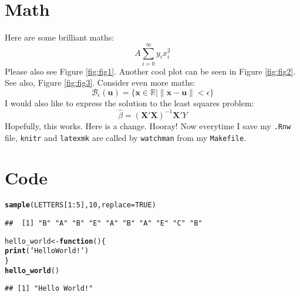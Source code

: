 \documentclass{article}\usepackage[]{graphicx}\usepackage[]{color}
\makeatletter
\newcommand{\hlnum}[1]{\textcolor[rgb]{0.686,0.059,0.569}{#1}}%
\newcommand{\hlstr}[1]{\textcolor[rgb]{0.192,0.494,0.8}{#1}}%
\newcommand{\hlopt}[1]{\textcolor[rgb]{0,0,0}{#1}}%
\newcommand{\hlstd}[1]{\textcolor[rgb]{0.345,0.345,0.345}{#1}}%
\newcommand{\hlkwa}[1]{\textcolor[rgb]{0.161,0.373,0.58}{\textbf{#1}}}%
\newcommand{\hlkwb}[1]{\textcolor[rgb]{0.69,0.353,0.396}{#1}}%
\newcommand{\hlkwc}[1]{\textcolor[rgb]{0.333,0.667,0.333}{#1}}%
\newcommand{\hlkwd}[1]{\textcolor[rgb]{0.737,0.353,0.396}{\textbf{#1}}}%
\newenvironment{kframe}{%
 \def\at@end@of@kframe{}%
 \ifinner\ifhmode%
  \def\at@end@of@kframe{\end{minipage}}%
  \begin{minipage}{\columnwidth}%
 \fi\fi%
 \def\FrameCommand##1{\hskip\@totalleftmargin \hskip-\fboxsep
 \colorbox{shadecolor}{##1}\hskip-\fboxsep
     \hskip-\linewidth \hskip-\@totalleftmargin \hskip\columnwidth}%
 \MakeFramed {\advance\hsize-\width
   \@totalleftmargin\z@ \linewidth\hsize
   \@setminipage}}%
 {\par\unskip\endMakeFramed%
 \at@end@of@kframe}
\newenvironment{knitrout}{}{} %
\makeatother
\begin{document}
\tableofcontents

\listoffigures

\section{Math} 
Here are some brilliant maths:
\[A\sum_{i = 0}^{\infty}y_{i}x_{i}^{2} \]
Please also see Figure \ref{fig:fig1}. Another cool plot can be seen
in Figure \ref{fig:fig2}.  See also, Figure \ref{fig:fig3}.  Consider even more
maths:
\[ \mathcal{B}_{\epsilon}(\mathbf{u}) = \{ \mathbf{x} \in \mathbb{R} | \lVert
\mathbf{x} - \mathbf{u} \rVert < \epsilon\}\]
I would also like to express the solution to the least squares problem:
\[\hat{\beta} = (\mathbf{X}'\mathbf{X})^{-1}\mathbf{X}'Y \]
Hopefully, this works.  Here is a change.  Hooray!  Now everytime I save my
\texttt{.Rnw} file, \texttt{knitr} and \texttt{latexmk} are called by
\texttt{watchman} from my \texttt{Makefile}.

\section{Code}
\begin{knitrout}
\color{fgcolor}\begin{kframe}
\begin{alltt}
\hlkwd{sample}\hlstd{(LETTERS[}\hlnum{1}\hlopt{:}\hlnum{5}\hlstd{],} \hlnum{10}\hlstd{,} \hlkwc{replace} \hlstd{=} \hlnum{TRUE}\hlstd{)}
\end{alltt}
\begin{verbatim}
##  [1] "B" "A" "B" "E" "A" "B" "A" "E" "C" "B"
\end{verbatim}
\end{kframe}
\end{knitrout}

\begin{knitrout}
\color{fgcolor}\begin{kframe}
\begin{alltt}
\hlstd{hello_world} \hlkwb{<-} \hlkwa{function}\hlstd{() \{}
  \hlkwd{print}\hlstd{(}\hlstr{'Hello World!'}\hlstd{)}
\hlstd{\}}
\hlkwd{hello_world}\hlstd{()}
\end{alltt}
\begin{verbatim}
## [1] "Hello World!"
\end{verbatim}
\end{kframe}
\end{knitrout}
\end{document}
